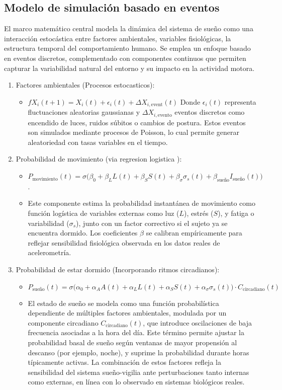 \documentclass[conference]{IEEEtran}
\begin{document}
\subsection{Modelo de simulación basado en eventos}
El marco matemático central modela la dinámica del sistema de sueño como una interacción estocástica entre factores ambientales, variables fisiológicas, la estructura temporal del comportamiento humano. Se emplea un enfoque basado en eventos discretos, complementado con componentes continuos que permiten capturar la variabilidad natural del entorno y su impacto en la actividad motora.
\begin{enumerate}
\item Factores ambientales (Procesos estocasticos):
    \begin{itemize}
    \item $fX_i(t+1) = X_i(t) + \epsilon_i(t) + \Delta X_{i,\text{event}}(t)$ 
    Donde \(\epsilon_i(t)\) representa fluctuaciones aleatorias gaussianas y \(\Delta X_{i,\text{evento}}\) eventos discretos como encendido de luces, ruidos súbitos o cambios de postura. Estos eventos son simulados mediante procesos de Poisson, lo cual permite generar aleatoriedad con tasas variables en el tiempo.
    \end{itemize}
\item Probabilidad de movimiento (via regresion logistica ):
    \begin{itemize}
    \item \(P_{\text{movimiento}}(t) = \sigma\big( \beta_0 + \beta_L L(t) + \beta_S S(t) + \beta_\sigma \sigma_s(t) + \beta_{\text{sue\~no}} I_{\text{sue\~no}}(t) \big)\).
    \item Este componente estima la probabilidad instantánea de movimiento como función logística de variables externas como luz (\(L\)), estrés (\(S\)), y fatiga o variabilidad (\(\sigma_s\)), junto con un factor correctivo si el sujeto ya se encuentra dormido. Los coeficientes \(\beta\) se calibran empíricamente para reflejar sensibilidad fisiológica observada en los datos reales de acelerometría.
    \end{itemize}
\item Probabilidad de estar dormido (Incorporando ritmos circadianos):
    \begin{itemize}
    \item \(P_{\text{sue\~no}}(t) = \sigma\big( \alpha_0 + \alpha_A A(t) + \alpha_L L(t) + \alpha_S S(t) + \alpha_\sigma \sigma_s(t) \big) \cdot C_{\text{circadiano}}(t)\)
    \item El estado de sueño se modela como una función probabilística dependiente de múltiples factores ambientales, modulada por un componente circadiano \(C_{\text{circadiano}}(t)\), que introduce oscilaciones de baja frecuencia asociadas a la hora del día. Este término permite ajustar la probabilidad basal de sueño según ventanas de mayor propensión al descanso (por ejemplo, noche), y suprime la probabilidad durante horas típicamente activas. La combinación de estos factores refleja la sensibilidad del sistema sueño-vigilia ante perturbaciones tanto internas como externas, en línea con lo observado en sistemas biológicos reales.
    \end{itemize}
\end{enumerate}
\end{document}
